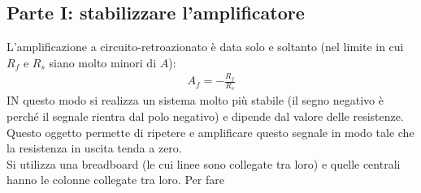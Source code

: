 \documentclass[a4paper, oneside]{article}
\begin{document}
\subsection{Parte I: stabilizzare l'amplificatore}
L'amplificazione a circuito-retroazionato è data solo e soltanto 
(nel limite in cui $R_f$ e $R_s$ siano molto minori di $A$):
\begin{gather*}
    A_f = - \frac{R_f}{R_s}
\end{gather*}
IN questo modo si realizza un sistema molto più stabile (il segno negativo è 
perché il segnale rientra dal polo negativo) e dipende dal valore delle resistenze. 
Questo oggetto permette di ripetere e amplificare questo segnale in modo tale che
la resistenza in uscita tenda a zero.  \\
Si utilizza una breadboard (le cui linee sono collegate tra loro)
e quelle centrali hanno le colonne collegate tra loro. Per fare 
\end{document}
